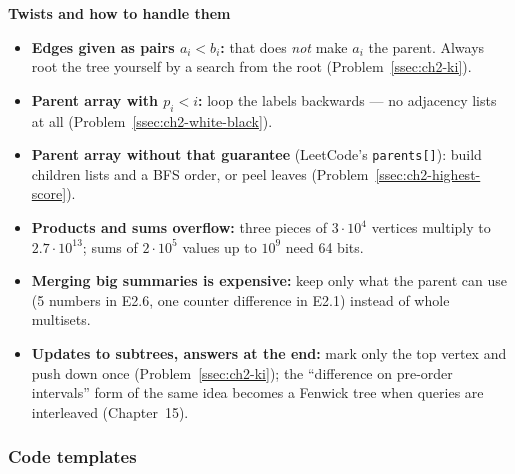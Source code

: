 \textbf{Twists and how to handle them}
\begin{itemize}[leftmargin=*]
    \item \textbf{Edges given as pairs $a_i < b_i$:} that does \emph{not} make $a_i$ the parent. Always root the tree yourself by a search from the root (Problem~\ref{ssec:ch2-ki}).
    \item \textbf{Parent array with $p_i < i$:} loop the labels backwards --- no adjacency lists at all (Problem~\ref{ssec:ch2-white-black}).
    \item \textbf{Parent array without that guarantee} (LeetCode's \texttt{parents[]}): build children lists and a BFS order, or peel leaves (Problem~\ref{ssec:ch2-highest-score}).
    \item \textbf{Products and sums overflow:} three pieces of $3\cdot10^4$ vertices multiply to $2.7\cdot10^{13}$; sums of $2\cdot10^5$ values up to $10^9$ need 64 bits.
    \item \textbf{Merging big summaries is expensive:} keep only what the parent can use (5 numbers in E2.6, one counter difference in E2.1) instead of whole multisets.
    \item \textbf{Updates to subtrees, answers at the end:} mark only the top vertex and push down once (Problem~\ref{ssec:ch2-ki}); the ``difference on pre-order intervals'' form of the same idea becomes a Fenwick tree when queries are interleaved (Chapter~15).
\end{itemize}

\subsubsection*{Code templates}

